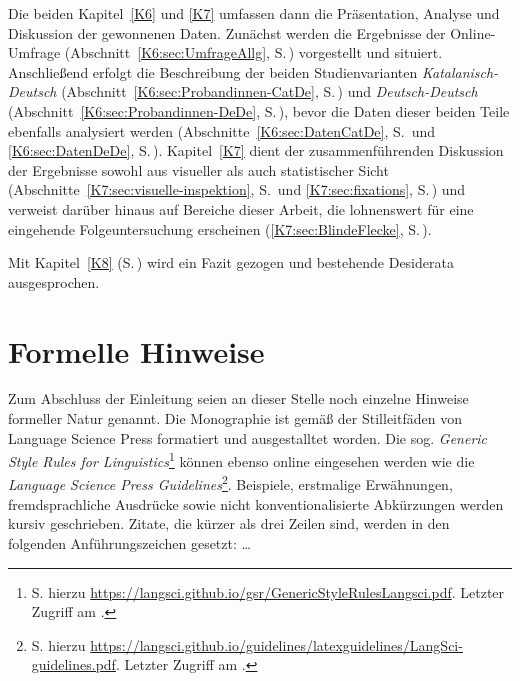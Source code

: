 Die beiden Kapitel~\ref{K6} und \ref{K7} umfassen dann die Präsentation, Analyse und Diskussion der gewonnenen Daten. Zunächst werden die Ergebnisse der Online-Umfrage (Abschnitt~\ref{K6:sec:UmfrageAllg}, S.\,\pageref{K6:sec:UmfrageAllg}) vorgestellt und situiert. Anschließend erfolgt die Beschreibung der beiden Studienvarianten \emph{Katalanisch-Deutsch} (Abschnitt~\ref{K6:sec:Probandinnen-CatDe}, S.\,\pageref{K6:sec:Probandinnen-CatDe}) und \emph{Deutsch-Deutsch} (Abschnitt~\ref{K6:sec:Probandinnen-DeDe}, S.\,\pageref{K6:sec:Probandinnen-DeDe}), bevor die Daten dieser beiden Teile ebenfalls analysiert werden (Abschnitte~\ref{K6:sec:DatenCatDe}, S.\,\pageref{K6:sec:DatenCatDe} und \ref{K6:sec:DatenDeDe}, S.\,\pageref{K6:sec:DatenDeDe}). Kapitel~\ref{K7} dient der zusammenführenden Diskussion der Ergebnisse sowohl aus visueller als auch statistischer Sicht (Abschnitte~\ref{K7:sec:visuelle-inspektion}, S.\,\pageref{K7:sec:visuelle-inspektion} und \ref{K7:sec:fixations}, S.\,\pageref{K7:sec:fixations}) und verweist darüber hinaus auf Bereiche dieser Arbeit, die lohnenswert für eine eingehende Folgeuntersuchung erscheinen (\ref{K7:sec:BlindeFlecke}, S.\,\pageref{K7:sec:BlindeFlecke}).

Mit Kapitel~\ref{K8} (S.\,\pageref{K8}) wird ein Fazit gezogen und bestehende Desiderata ausgesprochen.


\section{Formelle Hinweise}
\label{K1:sec:Formalia}

\begin{sloppypar}
Zum Abschluss der Einleitung seien an dieser Stelle noch einzelne Hinweise formeller Natur genannt. Die Monographie ist gemäß der Stilleitfäden von Language Science Press formatiert und ausgestalltet worden. Die sog. \emph{Generic Style Rules for Linguistics}\footnote{S. hierzu \url{https://langsci.github.io/gsr/GenericStyleRulesLangsci.pdf}. Letzter Zugriff am \datum{}.} können ebenso online eingesehen werden wie die \emph{Language Science Press Guidelines}\footnote{S. hierzu \url{https://langsci.github.io/guidelines/latexguidelines/LangSci-guidelines.pdf}. Letzter Zugriff am \datum{}.}. Beispiele, erstmalige Erwähnungen, fremdsprachliche Ausdrücke sowie nicht konventionalisierte Abkürzungen werden kursiv geschrieben. Zitate, die kürzer als drei Zeilen sind, werden in den folgenden Anführungszeichen gesetzt: \glqq \ldots \grqq{}\end{sloppypar}

